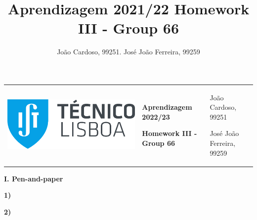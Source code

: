 \documentclass[11pt,a4paper]{article}
\title{Aprendizagem 2021/22 Homework III - Group 66}
\author{João Cardoso, 99251. José João Ferreira, 99259}
\begin{document}
\color{darkgray}
\hspace{-8.25mm}
\begin{tabularx}{1.09\textwidth} {>{\raggedright\arraybackslash}X >{\centering\arraybackslash}X >{\raggedleft\arraybackslash}X}
  \includegraphics[scale=0.2]{tecnico.pdf} &
  \textbf{Aprendizagem 2022/23} \par \textbf{Homework III - Group 66} &
  João Cardoso, 99251 \par José João Ferreira, 99259
\end{tabularx}
\color{black}

\begin{center}
\textbf{I. Pen-and-paper}
\end{center}

\begin{flushleft}
\textbf{1)}
\small
\end{flushleft}
\normalsize

\begin{flushleft}
\textbf{2)}
\small
\end{flushleft}
\normalsize
\end{document}
